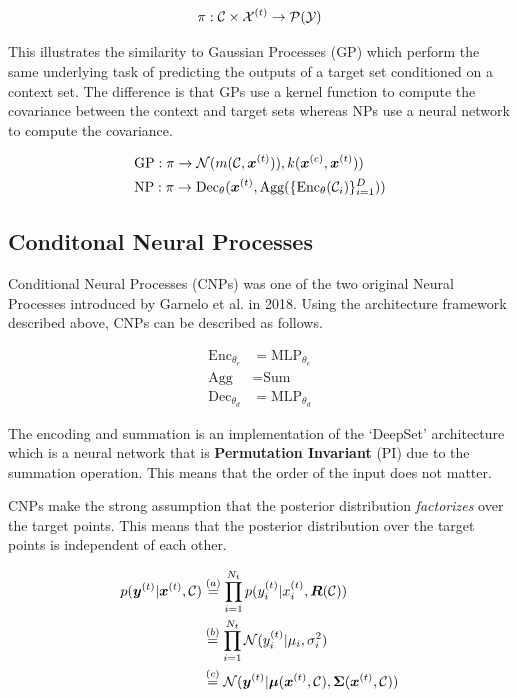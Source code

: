 \documentclass[../../main.tex]{subfiles}
\begin{document}
\begin{equation}
    \pi: \mathcal{C} \times \mathcal{X}^{(t)} \rightarrow \mathcal{P}(\mathcal{Y})
\end{equation}


This illustrates the similarity to Gaussian Processes (GP) \cite{books/lib/RasmussenW06} which perform the same underlying task of predicting the outputs of a target set conditioned on a context set. The difference is that GPs use a kernel function to compute the covariance between the context and target sets whereas NPs use a neural network to compute the covariance.

\begin{align}
    &\text{GP}: \pi \rightarrow \mathcal{N}(m(
    \mathcal{C}, \bm{x}^{(t)})
    ), k(\bm{x}^{(c)}, \bm{x}^{(t)})) \\
    &\text{NP}: \pi \rightarrow \text{Dec}_\theta(\bm{x}^{(t)},  
    \text{Agg}(\{ \text{Enc}_\theta(\mathcal{C}_i) \}_{i=1}^D))
\end{align}




\subsection{Conditonal Neural Processes}

Conditional Neural Processes (CNPs) \cite{garnelo2018conditional} was one of the two original Neural Processes introduced by Garnelo et al. in 2018. Using the architecture framework described above, CNPs can be described as follows.

\begin{align*}
    \text{Enc}_{\theta_e} &= \text{MLP}_{\theta_e} \\
    \text{Agg} &= \text{Sum} \\
    \text{Dec}_{\theta_d}  &= \text{MLP}_{\theta_d} 
\end{align*}

The encoding and summation is an implementation of the `DeepSet' architecture \cite{zaheer2018deep} which is a neural network that is \textbf{Permutation Invariant} (PI) due to the summation operation. This means that the order of the input does not matter. 


CNPs make the strong assumption that the posterior distribution \emph{factorizes} over the target points. This means that the posterior distribution over the target points is independent of each other. 

\begin{align}
    p(\bm{y}^{(t)} | \bm{x}^{(t)}, \mathcal{C}) &\stackrel{(a)}{=} \prod_{i=1}^{N_t} p({y}_i^{(t)} | {x}_i^{(t)}, \bm{R}(\mathcal{C})) \\ &\stackrel{(b)}{=}
    \prod_{i=1}^{N_t} \mathcal{N}({y}_i^{(t)} | \mu_i, \sigma_i^2) \\&\stackrel{(c)}{=} \mathcal{N}(\bm{y}^{(t)} | \bm{\mu}(\bm{x}^{(t)}, \mathcal{C}), \bm{\Sigma}(\bm{x}^{(t)}, \mathcal{C}))
\end{align}
\end{document}
